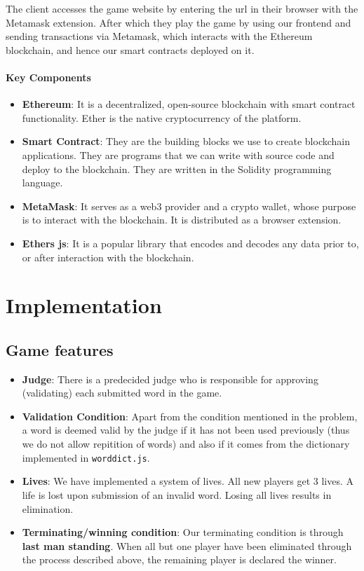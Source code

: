 \documentclass{article}
\begin{document}
The client accesses the game website by entering the url in their browser with the Metamask extension. 
After which they play the game by using our frontend and sending transactions via Metamask, which interacts with the Ethereum blockchain, and hence our smart contracts deployed on it.

\paragraph{Key Components}
\begin{itemize}
\item[] \textbf{Ethereum}: It is a decentralized, open-source blockchain with smart contract functionality. Ether is the native cryptocurrency of the platform.
\item[] \textbf{Smart Contract}: They are the building blocks we use to create blockchain applications. They are programs that we can write with source code and deploy to the blockchain. They are written in the Solidity programming language. 
\item[] \textbf{MetaMask}: It serves as a web3 provider and a crypto wallet, whose purpose is to interact with the blockchain. It is distributed as a browser extension. 
\item[] \textbf{Ethers js}: It is a popular library that encodes and decodes any data prior to, or after interaction with the blockchain.

\end{itemize}



\section{Implementation}

\subsection{Game features}

\begin{itemize}
    \item[] \textbf{Judge}:
    There is a predecided judge who is responsible for approving (validating) each
    submitted word in the game.
    \item[] \textbf{Validation Condition}:
    Apart from the condition mentioned in the problem, a word is deemed valid by the
    judge if it has not been used previously (thus we do not allow repitition of words)
    and also if it comes from the dictionary implemented in \verb|worddict.js|.
    \item[] \textbf{Lives}:
    We have implemented a system of lives. All new players get 3 lives. A life is lost upon submission of an invalid word. Losing all lives results in elimination.
    \item[] \textbf{Terminating/winning condition}: 
    Our terminating condition is through \textbf{last man standing}. When all but one
    player have been eliminated through the process described above, the remaining
    player is declared the winner.
\end{itemize}
\end{document}
